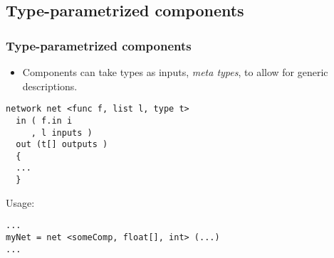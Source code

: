 \subsection*{Type-parametrized components}
\begin{frame}[shrink=4,fragile]
\frametitle{Type-parametrized components}

\begin{itemize}\pause
\item Components can take types as inputs, \emph{meta types}, to allow for
  generic descriptions.
\end{itemize}

\pause

\begin{example}
\begin{verbatim}
network net <func f, list l, type t>
  in ( f.in i
     , l inputs )
  out (t[] outputs )
  {
  ...
  }
\end{verbatim}
\end{example}

\pause

\begin{block}{Usage:}
\begin{verbatim}
...
myNet = net <someComp, float[], int> (...)
...
\end{verbatim}
\end{block}
\end{frame}
